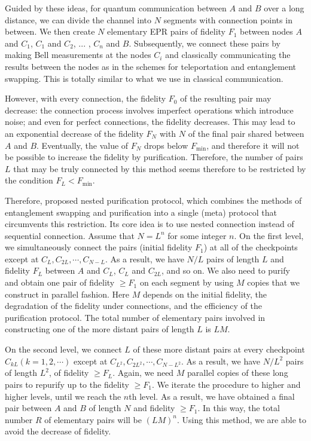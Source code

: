 \documentclass[10pt]{article}
\begin{document}
Guided by these ideas, for quantum communication between $A$ and $B$ over a long distance, we can divide the channel into $N$ segments with connection points in between. We then create $N$ elementary EPR pairs of fidelity $F_1$ between nodes $A$ and $C_1$, $C_1$ and $C_2$, ... , $C_n$ and $B$.  
Subsequently, we connect these pairs by making Bell measurements at the nodes $C_i$ and classically communicating the results between the nodes as in the schemes for teleportation\cite{vaidman1994teleportation} and entanglement swapping\cite{zukowski1993event}. This is totally similar to what we use in classical communication.

However, with every connection, the fidelity $F_0$ of the resulting pair may decrease: the connection process involves imperfect operations which introduce noise; and even for perfect connections, the fidelity decreases.
This may lead to an exponential decrease of the fidelity $F_N$ with $N$ of the final pair shared between $A$ and $B$. Eventually, the value of $F_N$ drops below $F_{\min}$, and therefore it will not be possible to increase the fidelity by purification. Therefore, the number of pairs $L$ that may be truly connected by this method seems therefore to be restricted by the condition $F_L<F_{\min}$.

Therefore, \cite{briegel1998quantum} proposed nested purification protocol, which combines
the methods of entanglement swapping and purification into a single (meta) protocol that circumvents this restriction. Its core idea is to use nested connection instead of sequential connection.
Assume that $N = L^n$ for some integer $n$. On the first level, we simultaneously connect the pairs (initial fidelity $F_1$) at all of the checkpoints except at $C_L,C_{2L},\cdots,C_{N-L}$. As a result, we have $N/L$ pairs of length $L$ and fidelity $F_L$ between $A$ and $C_L$, $C_L$ and $C_{2L}$, and so on. We also need to purify and obtain one pair of fidelity $\geq F_1$ on each segment by using $M$ copies that we construct in parallel fashion. Here $M$ depends on the initial fidelity, the degradation of the fidelity under connections, and the efficiency of the purification protocol. The total number of elementary pairs involved in constructing one of the more distant pairs of length $L$ is $LM$. 

On the second level, we connect $L$ of these more distant pairs at every checkpoint $C_{kL}(k = 1, 2, \cdots)$ except at $C_{L^2},C_{2L^2},\cdots,C_{N-L^2}$. As a result, we have $N/L^2$ pairs of length $L^2$, of fidelity $\geq F_L$. Again, we need $M$ parallel copies of these long pairs to repurify up to the fidelity $\geq F_1$. We iterate the procedure to higher and higher levels, until we reach the $n$th level. As a result, we have obtained a final pair between $A$ and $B$ of length $N$ and fidelity $\geq F_1$. In this way, the
total number $R$ of elementary pairs will be $(LM)^n$. Using this method, we are able to avoid the decrease of fidelity.
\end{document}
